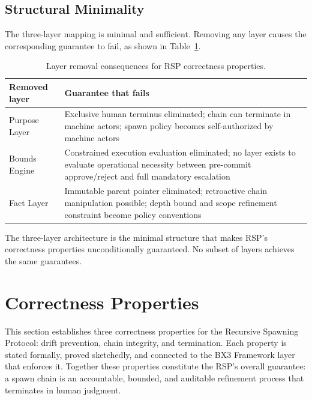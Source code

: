 \subsection{Structural Minimality}
\label{sec:rs-minimality}

The three-layer mapping is minimal and sufficient. Removing any layer causes the corresponding guarantee to fail, as shown in Table~\ref{tab:layer-minimality-rs}.

\begin{table}[h]
\centering
\begin{tabular}{p{3.2cm} p{4.8cm}}
\toprule
\textbf{Removed layer} & \textbf{Guarantee that fails} \\
\midrule
Purpose Layer & Exclusive human terminus eliminated; chain can terminate in machine actors; spawn policy becomes self-authorized by machine actors \\
Bounds Engine & Constrained execution evaluation eliminated; no layer exists to evaluate operational necessity between pre-commit approve/reject and full mandatory escalation \\
Fact Layer & Immutable parent pointer eliminated; retroactive chain manipulation possible; depth bound and scope refinement constraint become policy conventions \\
\bottomrule
\end{tabular}
\caption{Layer removal consequences for RSP correctness properties.}
\label{tab:layer-minimality-rs}
\end{table}

The three-layer architecture is the minimal structure that makes RSP's correctness properties unconditionally guaranteed. No subset of layers achieves the same guarantees.

\section{Correctness Properties}
\label{sec:rs-correctness}

This section establishes three correctness properties for the Recursive Spawning Protocol: drift prevention, chain integrity, and termination. Each property is stated formally, proved sketchedly, and connected to the BX3 Framework layer that enforces it. Together these properties constitute the RSP's overall guarantee: a spawn chain is an accountable, bounded, and auditable refinement process that terminates in human judgment.

